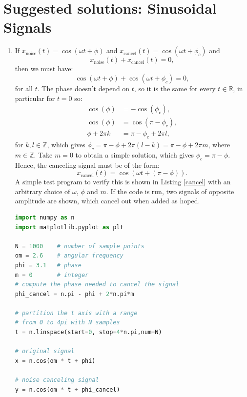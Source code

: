 \newpage
\section{Suggested solutions: Sinusoidal Signals}
\begin{enumerate}
\item If $x_{\text{noise}}(t)=\cos(\omega t+\phi)$ and $x_{\text{cancel}}(t)=\cos(\omega t+\phi_{c})$ and
$$x_{\text{noise}}(t)+x_{\text{cancel}}(t)=0,$$
then we must have:
$$\cos(\omega t+\phi)+\cos(\omega t+\phi_{c})=0,$$
for all $t$. The phase doesn't depend on $t$, so it is the same for every $t\in\mathbb{R}$, in particular for $t=0$ so:
\begin{align*}
    \cos(\phi)&=-\cos(\phi_{c}), \\
    \cos(\phi)&=\cos(\pi -\phi_{c}), \\
    \phi+2\pi k&=\pi-\phi_{c}+2\pi l,
\end{align*}
for $k,l\in\mathbb{Z}$, which gives $\phi_{c}=\pi-\phi+2\pi(l-k)=\pi-\phi+2\pi m$, 
where $m\in\mathbb{Z}$. Take $m=0$ to obtain a simple solution, which gives $\phi_{c}=\pi -\phi$.
Hence, the canceling signal must be of the form:
$$x_{\text{cancel}}(t)=\cos(\omega t+(\pi-\phi)).$$
A simple test program to verify this is shown in Listing \ref{cancel} 
with an arbitrary choice of $\omega$, $\phi$ and $m$. 
If the code is run, two signals of opposite amplitude are shown, 
which cancel out when added as hoped. 

\begin{lstlisting}[language=Python, caption=Noise canceling signal,label=cancel]
import numpy as n
import matplotlib.pyplot as plt

N = 1000    # number of sample points
om = 2.6    # angular frequency
phi = 3.1   # phase
m = 0       # integer
# compute the phase needed to cancel the signal
phi_cancel = n.pi - phi + 2*n.pi*m    

# partition the t axis with a range 
# from 0 to 4pi with N samples
t = n.linspace(start=0, stop=4*n.pi,num=N)

# original signal
x = n.cos(om * t + phi)

# noise canceling signal
y = n.cos(om * t + phi_cancel)


\end{lstlisting}
\end{enumerate}
